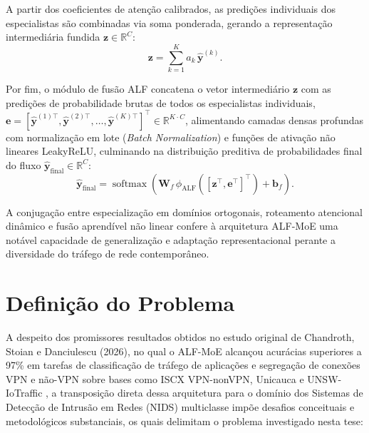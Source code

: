 A partir dos coeficientes de atenção calibrados, as predições individuais dos especialistas são combinadas via soma ponderada, gerando a representação intermediária fundida $\mathbf{z} \in \mathbb{R}^C$:
\begin{equation}
\label{eq:fused_representation}
\mathbf{z} = \sum_{k=1}^K a_k \, \hat{\mathbf{y}}^{(k)}.
\end{equation}

Por fim, o módulo de fusão ALF concatena o vetor intermediário $\mathbf{z}$ com as predições de probabilidade brutas de todos os especialistas individuais, $\mathbf{e} = [\hat{\mathbf{y}}^{(1)\top}, \hat{\mathbf{y}}^{(2)\top}, \dots, \hat{\mathbf{y}}^{(K)\top}]^\top \in \mathbb{R}^{K \cdot C}$, alimentando camadas densas profundas com normalização em lote (\emph{Batch Normalization}) e funções de ativação não lineares LeakyReLU, culminando na distribuição preditiva de probabilidades final do fluxo $\hat{\mathbf{y}}_{\mathrm{final}} \in \mathbb{R}^C$:
\begin{equation}
\label{eq:final_prediction}
\hat{\mathbf{y}}_{\mathrm{final}} = \operatorname{softmax}\left(\mathbf{W}_f \, \phi_{\mathrm{ALF}}\left([\mathbf{z}^\top, \mathbf{e}^\top]^\top\right) + \mathbf{b}_f\right).
\end{equation}

A conjugação entre especialização em domínios ortogonais, roteamento atencional dinâmico e fusão aprendível não linear confere à arquitetura ALF-MoE uma notável capacidade de generalização e adaptação representacional perante a diversidade do tráfego de rede contemporâneo.

\section{Definição do Problema}
\label{sec:problema}

A despeito dos promissores resultados obtidos no estudo original de Chandroth, Stoian e Danciulescu (2026), no qual o ALF-MoE alcançou acurácias superiores a 97\% em tarefas de classificação de tráfego de aplicações e segregação de conexões VPN e não-VPN sobre bases como ISCX VPN-nonVPN, Unicauca e UNSW-IoTraffic \cite{alfmoe2026}, a transposição direta dessa arquitetura para o domínio dos Sistemas de Detecção de Intrusão em Redes (NIDS) multiclasse impõe desafios conceituais e metodológicos substanciais, os quais delimitam o problema investigado nesta tese:

